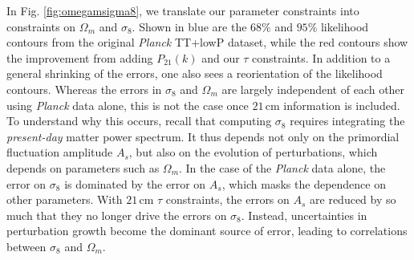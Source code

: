 \documentclass[twocolumn,aps,prd,nofootinbib,showpacs]{revtex4-1}
\begin{document}
In Fig. \ref{fig:omegamsigma8}, we translate our parameter constraints into constraints on $\Omega_m$ and $\sigma_8$. Shown in blue are the $68\%$ and $95\%$ likelihood contours from the original \emph{Planck} TT+lowP dataset, while the red contours show the improvement from adding $P_{21} (k)$ and our $\tau$ constraints. In addition to a general shrinking of the errors, one also sees a reorientation of the likelihood contours. Whereas the errors in $\sigma_8$ and $\Omega_m$ are largely independent of each other using \emph{Planck} data alone, this is not the case once $21\,\textrm{cm}$ information is included. To understand why this occurs, recall that computing $\sigma_8$ requires integrating the \emph{present-day} matter power spectrum. It thus depends not only on the primordial fluctuation amplitude $A_s$, but also on the evolution of perturbations, which depends on parameters such as $\Omega_m$. In the case of the \emph{Planck} data alone, the error on $\sigma_8$ is dominated by the error on $A_s$, which masks the dependence on other parameters. With $21\,\textrm{cm}$ $\tau$ constraints, the errors on $A_s$ are reduced by so much that they no longer drive the errors on $\sigma_8$. Instead, uncertainties in perturbation growth become the dominant source of error, leading to correlations between $\sigma_8$ and $\Omega_m$.
%
\end{document}
